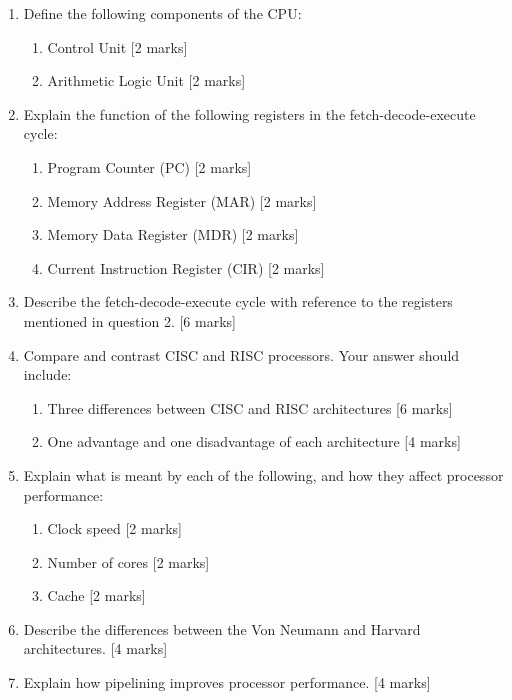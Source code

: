 \documentclass{article}
\begin{document}
\begin{enumerate}

\item Define the following components of the CPU:
\begin{enumerate}[label=(\alph*)]
    \item Control Unit [2 marks]
    \item Arithmetic Logic Unit [2 marks]
\end{enumerate}

\item Explain the function of the following registers in the fetch-decode-execute cycle:
\begin{enumerate}[label=(\alph*)]
    \item Program Counter (PC) [2 marks]
    \item Memory Address Register (MAR) [2 marks]
    \item Memory Data Register (MDR) [2 marks]
    \item Current Instruction Register (CIR) [2 marks]
\end{enumerate}

\item Describe the fetch-decode-execute cycle with reference to the registers mentioned in question 2. [6 marks]

\item Compare and contrast CISC and RISC processors. Your answer should include:
\begin{enumerate}[label=(\alph*)]
    \item Three differences between CISC and RISC architectures [6 marks]
    \item One advantage and one disadvantage of each architecture [4 marks]
\end{enumerate}

\item Explain what is meant by each of the following, and how they affect processor performance:
\begin{enumerate}[label=(\alph*)]
    \item Clock speed [2 marks]
    \item Number of cores [2 marks]
    \item Cache [2 marks]
\end{enumerate}

\item Describe the differences between the Von Neumann and Harvard architectures. [4 marks]

\item Explain how pipelining improves processor performance. [4 marks]


\end{enumerate}
\end{document}
